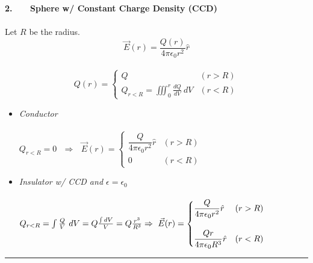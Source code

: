 \documentclass[12pt]{article}
\begin{document}
\newpage \noindent
\begin{minipage}[t]{0.5\textwidth}
\textbf{2. \ \ \ Sphere w/ Constant Charge Density (CCD)}\\ \\
Let \(R\) be the radius.\\
\[ \vec{E}(r) = \frac{ Q(r) }{4 \pi \epsilon_0 r^2} \hat{r} \]\\
\[ Q(r) = \begin{cases}
	Q & (r > R)\\
	Q_{r<R} = \iiint_0^r \frac{dQ}{dV} \ dV & (r < R)
\end{cases} \]

\hfill \break
\begin{itemize}
	\item \emph{Conductor} \\ \\
	\( Q_{r<R} = 0
	\ \ \ \Rightarrow \ \ \ \vec{E}(r) = \begin{cases}
		\dfrac{ Q }{4 \pi \epsilon_0 r^2} \hat{r} & (r > R)\\
		0 & (r < R)
	\end{cases} \)
\end{itemize}

\hfill \break
\begin{itemize}
	\item \emph{Insulator w/ CCD and \(\epsilon = \epsilon_0\)} \\ \\
	\( Q_{r<R} = \int \frac{Q}{V} \ dV = Q \frac{\int dV}{V} = Q \frac{r^3}{R^3}\\ \\
	\Rightarrow \ \vec{E}(r) = \begin{cases}
		\dfrac{ Q }{4 \pi \epsilon_0 r^2} \hat{r} & (r > R)\\ \\
		\dfrac{ Q r}{4 \pi \epsilon_0 R^3} \hat{r} & (r < R)
	\end{cases} \)
\end{itemize}
\end{minipage}
\rule[-438pt]{.5pt}{450pt}
\hspace{.01\textwidth}
\end{document}

